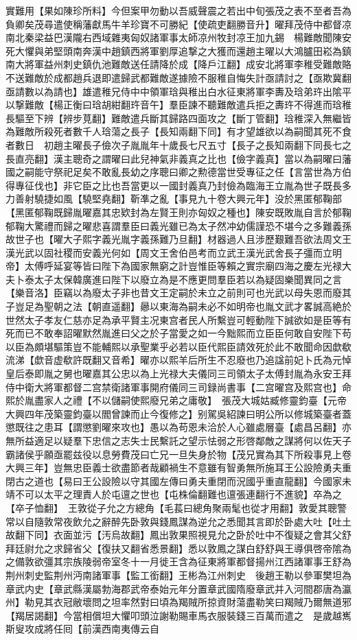 實難用【果如陳珍所料】今但案甲勿動以吾威聲震之若出中旬張茂之表不至者吾為負卿矣茂尋遣使稱藩獻馬牛羊珍寶不可勝紀【使疏吏翻勝音升】曜拜茂侍中都督凉南北秦梁益巴漢隴右西域雜夷匈奴諸軍事太師凉州牧封凉王加九錫　楊難敵聞陳安死大懼與弟堅頭南奔漢中趙鎮西將軍劉厚追撃之大獲而還趙主曜以大鴻臚田崧為鎮南大將軍益州刺史鎮仇池難敵送任請降於成【降戶江翻】成安北將軍李稚受難敵賂不送難敵於成都趙兵退即遣歸武都難敵遂據險不服稚自悔失計亟請討之【亟欺冀翻亟請數以為請也】雄遣稚兄侍中中領軍琀與稚出白水征東將軍李夀及琀弟玝出隂平以撃難敵【楊正衡曰琀胡紺翻玝音午】羣臣諫不聽難敵遣兵拒之夀玝不得進而琀稚長驅至下辨【辨步莧翻】難敵遣兵斷其歸路四面攻之【斷丁管翻】琀稚深入無繼皆為難敵所殺死者數千人琀蕩之長子【長知兩翻下同】有才望雄欲以為嗣聞其死不食者數日　初趙主曜長子儉次子胤胤年十歲長七尺五寸【長子之長知兩翻下同長七之長直亮翻】漢主聰奇之謂曜曰此兒神氣非義真之比也【儉字義真】當以為嗣曜曰藩國之嗣能守祭祀足矣不敢亂長幼之序聰曰卿之勲德當世受專征之任【言當世為方伯得專征伐也】非它臣之比也吾當更以一國封義真乃封儉為臨海王立胤為世子既長多力善射驍捷如風【驍堅堯翻】靳凖之亂【事見九十卷大興元年】没於黑匿郁鞠部【黑匿郁鞠既歸胤曜嘉其忠欵封為左賢王則亦匈奴之種也】陳安既敗胤自言於郁鞠郁鞠大驚禮而歸之曜悲喜謂羣臣曰義光雖已為太子然冲幼儒謹恐不堪今之多難義孫故世子也【曜大子熙字義光胤字義孫難乃旦翻】材器過人且涉歷艱難吾欲法周文王漢光武以固社稷而安義光何如【周文王舍伯邑考而立武王漢光武舍長子彊而立明帝】太傅呼延宴等皆曰陛下為國家無窮之計豈惟臣等賴之實宗廟四海之慶左光禄大夫卜泰太子太保韓廣進曰陛下以廢立為是不應更問羣臣若以為疑固樂聞異同之言【樂音洛】臣竊以為廢太子非也昔文王定嗣於未立之前則可也光武以母失恩而廢其子豈足為聖朝之法【朝直遥翻】曏以東海為嗣未必不如明帝也胤文武才畧誠高絶於世然太子孝友仁慈亦足為承平賢主况東宫者民人所繫豈可輕動陛下誠欲如是臣等有死而已不敢奉詔曜默然胤進曰父之於子當愛之如一今黜熙而立臣臣何敢自安陛下苟以臣為頗堪驅策豈不能輔熙以承聖業乎必若以臣代熙臣請效死於此不敢聞命因歔欷流涕【歔音虚欷許既翻又音希】曜亦以熙羊后所生不忍廢也乃追諡前妃卜氏為元悼皇后泰即胤之舅也曜嘉其公忠以為上光禄大夫儀同三司領太子太傅封胤為永安王拜侍中衛大將軍都督二宫禁衛諸軍事開府儀同三司録尚書事【二宫曜宫及熙宫也】命熙於胤盡家人之禮【不以儲嗣使熙廢兄弟之庸敬】　張茂大城姑臧修靈鈞臺【元帝大興四年茂築靈鈞臺以閻曾諫而止今復修之】别駕吳紹諫曰明公所以修城築臺者蓋懲既往之患耳【謂懲劉曜來攻也】愚以為苟恩未洽於人心雖處層臺【處昌呂翻】亦無所益適足以疑羣下忠信之志失士民繫託之望示怯弱之形啓鄰敵之謀將何以佐天子霸諸侯乎願亟罷兹役以息勞費茂曰亡兄一旦失身於物【茂兄實為其下所殺事見上卷大興三年】豈無忠臣義士欲盡節者哉顧禍生不意雖有智勇無所施耳王公設險勇夫重閉古之道也【易曰王公設險以守其國左傳曰勇夫重閉而況國乎重直龍翻】今國家未靖不可以太平之理責人於屯邅之世也【屯株倫翻難也邅張連翻行不進貌】卒為之【卒子恤翻】　王敦從子允之方總角【毛萇曰總角聚兩髦也從才用翻】敦愛其聰警常以自隨敦常夜飲允之辭醉先卧敦與錢鳳謀為逆允之悉聞其言即於卧處大吐【吐土故翻下同】衣面並污【汚烏故翻】鳳出敦果照視見允之卧於吐中不復疑之會其父舒拜廷尉允之求歸省父【復扶又翻省悉景翻】悉以敦鳳之謀白舒舒與王導俱啓帝隂為之備敦欲彊其宗族陵弱帝室冬十一月徙王含為征東將軍都督揚州江西諸軍事王舒為荆州刺史監荆州沔南諸軍事【監工銜翻】王彬為江州刺史　後趙王勒以參軍樊坦為章武内史【章武縣漢屬勃海郡武帝泰始元年分置章武國隋廢章武并入河間郡唐為瀛州】勒見其衣冠敝壞問之坦率然對曰頃為羯賊所掠資財蕩盡勒笑曰羯賊乃爾無道邪【羯居謁翻】今當相償坦大懼叩頭泣謝勒賜車馬衣服裝錢三百萬而遣之　是歲越嶲斯叟攻成將任囘【前漢西南夷傳云自